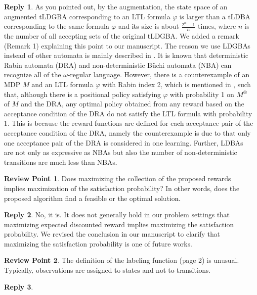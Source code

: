 \documentclass[10 pt, dvipdfmx]{article}
\theoremstyle{definition}
\newtheorem{review point}{Review Point}[section]
\newtheorem*{reply}{Reply}
\begin{document}
\begin{reply}
 As you pointed out, by the augmentation, the state space of an augmented tLDGBA corresponding to an LTL formula $\varphi$ is larger than a tLDBA corresponding to the same formula $\varphi$ and its size is about $\frac{2^{n}-1}{n}$ times, where $n$ is the number of all accepting sets of the original tLDGBA. We added a remark (Remark 1) explaining this point to our manuscript. The reason we use LDGBAs instead of other automata is mainly described in \cite{Hahn2019}. It is known that deterministic Rabin automata (DRA) and non-deterministic B\"{u}chi automata (NBA) can recognize all of the $\omega$-regular language. However, there is a counterexample of an MDP $M$ and an LTL formula $\varphi$ with Rabin index 2, which is mentioned in \cite{Hahn2019}, such that, although there is a positional policy satisfying $\varphi$ with probability 1 on $M^{\otimes}$ of $M$ and the DRA, any optimal policy obtained from any reward based on the acceptance condition of the DRA do not satisfy the LTL formula with probability 1. This is because the reward functions are defined for each acceptance pair of the acceptance condition of the DRA, namely the counterexample is due to that only one acceptance pair of the DRA is considered in one learning. Further, LDBAs are not only as expressive as NBAs but also the number of non-deterministic transitions are much less than NBAs.
\end{reply}

\begin{review point}
  Does maximizing the collection of the proposed rewards implies
maximization of the satisfaction probability? In other words, does the
proposed algorithm find a feasible or the optimal solution.
\end{review point}

\begin{reply}
 No, it is. It does not generally hold in our problem settings that maximizing expected discounted reward implies maximizing the satisfaction probability. We revised the conclusion in our manuscript to clarify that maximizing the satisfaction probability is one of future works.
\end{reply}

\begin{review point}
  The definition of the labeling function (page 2) is unusual. Typically, observations are assigned to states and not to transitions.
\end{review point}

\begin{reply}

\end{reply}
\end{document}
